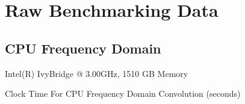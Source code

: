 \appendix
\startcontents[appendices]
\newpage
\section{Raw Benchmarking Data}
\subsection{CPU Frequency Domain}
\begin{center}
    Intel(R) IvyBridge @ 3.00GHz, 1510 GB Memory
    
    Clock Time For CPU Frequency Domain Convolution (seconds)
   

\end{center}
